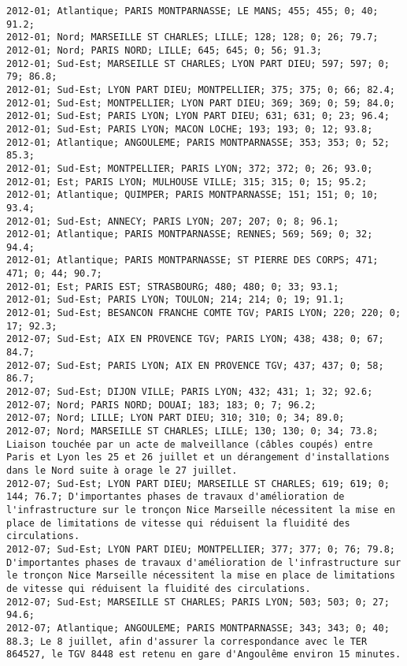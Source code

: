 \documentclass{article}
\begin{document}
\begin{Verbatim}[commandchars=\\\{\}]
2012-01; Atlantique; PARIS MONTPARNASSE; LE MANS; 455; 455; 0; 40; 91.2; 
2012-01; Nord; MARSEILLE ST CHARLES; LILLE; 128; 128; 0; 26; 79.7; 
2012-01; Nord; PARIS NORD; LILLE; 645; 645; 0; 56; 91.3; 
2012-01; Sud-Est; MARSEILLE ST CHARLES; LYON PART DIEU; 597; 597; 0; 79; 86.8; 
2012-01; Sud-Est; LYON PART DIEU; MONTPELLIER; 375; 375; 0; 66; 82.4; 
2012-01; Sud-Est; MONTPELLIER; LYON PART DIEU; 369; 369; 0; 59; 84.0; 
2012-01; Sud-Est; PARIS LYON; LYON PART DIEU; 631; 631; 0; 23; 96.4; 
2012-01; Sud-Est; PARIS LYON; MACON LOCHE; 193; 193; 0; 12; 93.8; 
2012-01; Atlantique; ANGOULEME; PARIS MONTPARNASSE; 353; 353; 0; 52; 85.3; 
2012-01; Sud-Est; MONTPELLIER; PARIS LYON; 372; 372; 0; 26; 93.0; 
2012-01; Est; PARIS LYON; MULHOUSE VILLE; 315; 315; 0; 15; 95.2; 
2012-01; Atlantique; QUIMPER; PARIS MONTPARNASSE; 151; 151; 0; 10; 93.4; 
2012-01; Sud-Est; ANNECY; PARIS LYON; 207; 207; 0; 8; 96.1; 
2012-01; Atlantique; PARIS MONTPARNASSE; RENNES; 569; 569; 0; 32; 94.4; 
2012-01; Atlantique; PARIS MONTPARNASSE; ST PIERRE DES CORPS; 471; 471; 0; 44; 90.7; 
2012-01; Est; PARIS EST; STRASBOURG; 480; 480; 0; 33; 93.1; 
2012-01; Sud-Est; PARIS LYON; TOULON; 214; 214; 0; 19; 91.1; 
2012-01; Sud-Est; BESANCON FRANCHE COMTE TGV; PARIS LYON; 220; 220; 0; 17; 92.3; 
2012-07; Sud-Est; AIX EN PROVENCE TGV; PARIS LYON; 438; 438; 0; 67; 84.7; 
2012-07; Sud-Est; PARIS LYON; AIX EN PROVENCE TGV; 437; 437; 0; 58; 86.7; 
2012-07; Sud-Est; DIJON VILLE; PARIS LYON; 432; 431; 1; 32; 92.6; 
2012-07; Nord; PARIS NORD; DOUAI; 183; 183; 0; 7; 96.2; 
2012-07; Nord; LILLE; LYON PART DIEU; 310; 310; 0; 34; 89.0; 
2012-07; Nord; MARSEILLE ST CHARLES; LILLE; 130; 130; 0; 34; 73.8; Liaison touchée par un acte de malveillance (câbles coupés) entre Paris et Lyon les 25 et 26 juillet et un dérangement d'installations dans le Nord suite à orage le 27 juillet.
2012-07; Sud-Est; LYON PART DIEU; MARSEILLE ST CHARLES; 619; 619; 0; 144; 76.7; D'importantes phases de travaux d'amélioration de l'infrastructure sur le tronçon Nice Marseille nécessitent la mise en place de limitations de vitesse qui réduisent la fluidité des circulations.
2012-07; Sud-Est; LYON PART DIEU; MONTPELLIER; 377; 377; 0; 76; 79.8; D'importantes phases de travaux d'amélioration de l'infrastructure sur le tronçon Nice Marseille nécessitent la mise en place de limitations de vitesse qui réduisent la fluidité des circulations.
2012-07; Sud-Est; MARSEILLE ST CHARLES; PARIS LYON; 503; 503; 0; 27; 94.6; 
2012-07; Atlantique; ANGOULEME; PARIS MONTPARNASSE; 343; 343; 0; 40; 88.3; Le 8 juillet, afin d'assurer la correspondance avec le TER 864527, le TGV 8448 est retenu en gare d'Angoulême environ 15 minutes.

\end{Verbatim}
\end{document}
